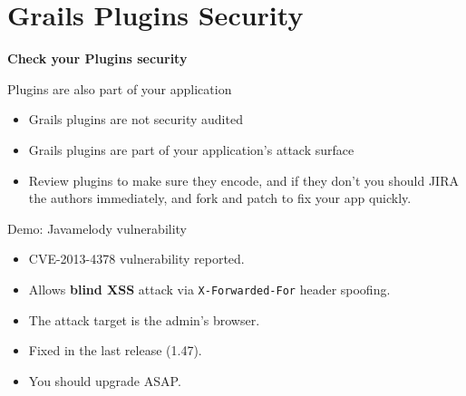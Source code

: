 
\section{Grails Plugins Security}

\begin{frame}[plain]
    \begin{center}
      \Huge\bfseries
      Check your Plugins security
    \end{center}
\end{frame}

\begin{frame}[plain]{Plugins are also part of your application}
  \begin{itemize}[<+-| alert@+>]
    \item Grails plugins are not security audited
    \item Grails plugins are part of your application's attack surface
    \item Review plugins to make sure they encode, and if they don't you should JIRA the authors immediately, and fork and patch to fix your app quickly.
  \end{itemize}
\end{frame}

\begin{frame}{Demo: Javamelody vulnerability}
  \begin{itemize}[<+-| alert@+>]
    \item CVE-2013-4378 vulnerability reported.
    \item Allows \textbf{blind XSS} attack via \verb|X-Forwarded-For| header spoofing.
    \item The attack target is the admin's browser.
    \item Fixed in the last release (1.47).
    \item You should upgrade ASAP.
  \end{itemize}
\end{frame}
